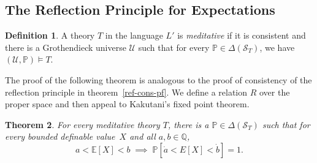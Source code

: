 \documentclass[12pt]{article}
\newcommand{\PP}{\mathbb{P}}
\newcommand{\EE}{\mathbb{E}}
\newcommand{\QQ}{\mathbb{Q}}
\newcommand{\cL}{L'}
\newcommand{\cS}{\mathcal{S}}
\newcommand{\cU}{\mathcal{U}}
\theoremstyle{plain}
\newtheorem{theorem}{Theorem}[subsection]
\theoremstyle{definition}
\newtheorem{definition}[theorem]{Definition}
\theoremstyle{remark}
\begin{document}
\subsection{The Reflection Principle for Expectations}
\begin{definition}
A theory $T$ in the language $\cL$ is \emph{meditative} if it is consistent and there is a Grothendieck universe $\cU$ such that for every $\PP\in\Delta(\cS_T)$, we have $(\cU,\PP)\vDash T$.
\end{definition}
The proof of the following theorem is analogous to the proof of consistency of the reflection principle in theorem~\ref{ref-cons-pf}.
We define a relation $R$ over the proper space and then appeal to Kakutani's fixed point theorem.
\begin{theorem}
For every meditative theory $T$, there is a $\PP\in\Delta(\cS_T)$ such that for every bounded definable value~$X$ and all $a,b\in\QQ$,
\[a<\EE[X]<b\;\implies\;\PP[\dot a < E[X] < \dot b] = 1.\]
\end{theorem}
\end{document}
